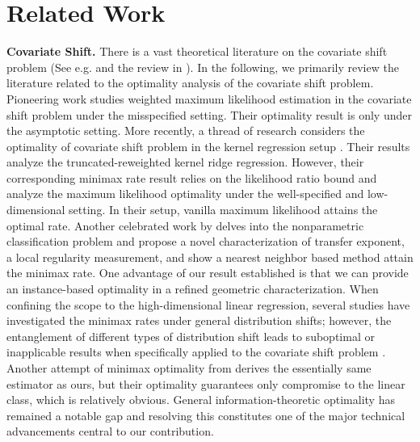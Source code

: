 \section{Related Work}
\textbf{Covariate Shift.} 
There is a vast theoretical literature on the covariate shift problem (See e.g. \citet{ben2010theory, germain2013pac, cortes2010learning, cortes2019adaptation} and the review in \citet{sugiyama2012machine,kouw2019review}). 
In the following, we primarily review the literature related to the optimality analysis of the covariate shift problem.
Pioneering work \citep{shimodaira2000improving} studies weighted maximum likelihood estimation in the covariate shift problem under the misspecified setting. Their optimality result is only under the asymptotic setting. 
More recently, a thread of research considers the optimality of covariate shift problem in the kernel regression setup \citep{ma2023optimally, pathak2022new}. Their results analyze the truncated-reweighted kernel ridge regression. However, their corresponding minimax rate result relies on the likelihood ratio bound and \citet{ge2023maximum} analyze the maximum likelihood optimality under the well-specified and low-dimensional setting. In their setup, vanilla maximum likelihood attains the optimal rate.
Another celebrated work by \citet{kpotufe2021marginal} delves into the nonparametric classification problem and propose a novel characterization of transfer exponent, a local regularity measurement, and show a nearest neighbor based method attain the minimax rate. One advantage of our result established is that we can provide an instance-based optimality in a refined geometric characterization.
When confining the scope to the high-dimensional linear regression, several studies have investigated the minimax rates under general distribution shifts; however, the entanglement of different types of distribution shift leads to suboptimal or inapplicable results when specifically applied to the covariate shift problem \citep{zhang2022class, mousavi2020minimax}. Another attempt of minimax optimality from \citet{lei2021near} derives the essentially same estimator as ours, but their optimality guarantees only compromise to the linear class, which is relatively obvious. General information-theoretic optimality has remained a notable gap and resolving this constitutes one of the major technical advancements central to our contribution.











